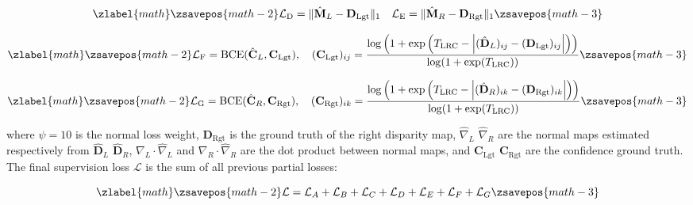 \documentclass[10pt,twocolumn,letterpaper]{article}
\begin{document}
\normalsize
\small

\begin{equation}
\zlabel{math}
    \zsavepos{math-2}
    \mathcal{L}_\text{D} = \lVert \hat{\mathbf{M}}_L - \mathbf{D}_\text{Lgt} \rVert_1  \quad \mathcal{L}_\text{E} = \lVert \hat{\mathbf{M}}_R - \mathbf{D}_\text{Rgt} \rVert_1
    \label{eq:loss_scaled_disp}
    \zsavepos{math-3}\end{equation}

\normalsize
\small

\begin{equation}
\zlabel{math}
    \zsavepos{math-2}
    \mathcal{L}_\text{F} = \text{BCE}(\hat{\mathbf{C}}_L,\mathbf{C}_\text{Lgt}), \quad (\mathbf{C}_\text{Lgt})_{ij} = \frac{\log\left(1+\exp\left(T_\text{LRC}-\left| (\hat{\mathbf{D}}_L)_{ij} - (\mathbf{D}_\text{Lgt})_{ij}  \right|\right)\right)}{\log(1+\exp(T_\text{LRC}))}
    \label{eq:loss_coarse_conf_left}
    \zsavepos{math-3}\end{equation}

\normalsize
\small

\begin{equation}
\zlabel{math}
    \zsavepos{math-2}
    \mathcal{L}_\text{G} = \text{BCE}(\hat{\mathbf{C}}_R,\mathbf{C}_\text{Rgt}), \quad (\mathbf{C}_\text{Rgt})_{ik} = \frac{\log\left(1+\exp\left(T_\text{LRC}-\left| (\hat{\mathbf{D}}_R)_{ik} - (\mathbf{D}_\text{Rgt})_{ik}  \right|\right)\right)}{\log(1+\exp(T_\text{LRC}))}
    \label{eq:loss_coarse_conf_right}
    \zsavepos{math-3}\end{equation}

\normalsize
where $\psi=10$ is the normal loss weight, $\mathbf{D}_\text{Rgt}$ is the ground truth of the right disparity map, $\hat{\nabla}_L$ $\hat{\nabla}_R$ are the normal maps estimated respectively from $\hat{\mathbf{D}}_L$ $\hat{\mathbf{D}}_R$, $\nabla_L\cdot\hat{\nabla}_L$ and $\nabla_R\cdot\hat{\nabla}_R$ are the dot product between normal maps, and $\mathbf{C}_\text{Lgt}$ $\mathbf{C}_\text{Rgt}$ are the confidence ground truth.
The final supervision loss $\mathcal{L}$ is the sum of all previous partial losses:
\small

\begin{equation}
\zlabel{math}
    \zsavepos{math-2}
    \mathcal{L} = \mathcal{L}_A + \mathcal{L}_B + \mathcal{L}_C + \mathcal{L}_D + \mathcal{L}_E + \mathcal{L}_F + \mathcal{L}_G
    \label{eq:total_loss}
    \zsavepos{math-3}\end{equation}
\end{document}
